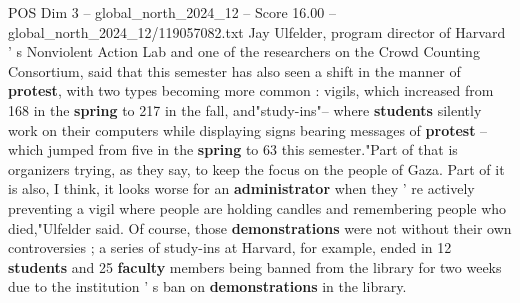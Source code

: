 \begin{textsample}{POS Dim 3 – global\_north\_2024\_12 – Score 16.00 – global\_north\_2024\_12/119057082.txt}
Jay Ulfelder, program director of Harvard ' s Nonviolent Action Lab and one of the researchers on the Crowd Counting Consortium, said that this semester has also seen a shift in the manner of \textbf{protest}, with two types becoming more common : vigils, which increased from 168 in the \textbf{spring} to 217 in the fall, and"study-ins"-- where \textbf{students} silently work on their computers while displaying signs bearing messages of \textbf{protest} -- which jumped from five in the \textbf{spring} to 63 this semester."Part of that is organizers trying, as they say, to keep the focus on the people of Gaza.
Part of it is also, I think, it looks worse for an \textbf{administrator} when they ' re actively preventing a vigil where people are holding candles and remembering people who died,"Ulfelder said.
Of course, those \textbf{demonstrations} were not without their own controversies ; a series of study-ins at Harvard, for example, ended in 12 \textbf{students} and 25 \textbf{faculty} members being banned from the library for two weeks due to the institution ' s ban on \textbf{demonstrations} in the library.

\end{textsample}
